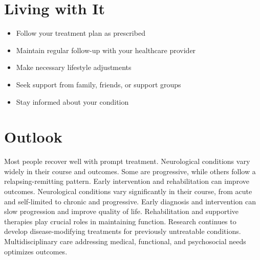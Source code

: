 \section{Living with It}
\begin{itemize}[noitemsep]
  \item Follow your treatment plan as prescribed
  \item Maintain regular follow-up with your healthcare provider
  \item Make necessary lifestyle adjustments
  \item Seek support from family, friends, or support groups
  \item Stay informed about your condition
\end{itemize}
\section{Outlook}
Most people recover well with prompt treatment. Neurological conditions vary widely in their course and outcomes. Some are progressive, while others follow a relapsing-remitting pattern. Early intervention and rehabilitation can improve outcomes. Neurological conditions vary significantly in their course, from acute and self-limited to chronic and progressive. Early diagnosis and intervention can slow progression and improve quality of life. Rehabilitation and supportive therapies play crucial roles in maintaining function. Research continues to develop disease-modifying treatments for previously untreatable conditions. Multidisciplinary care addressing medical, functional, and psychosocial needs optimizes outcomes.
